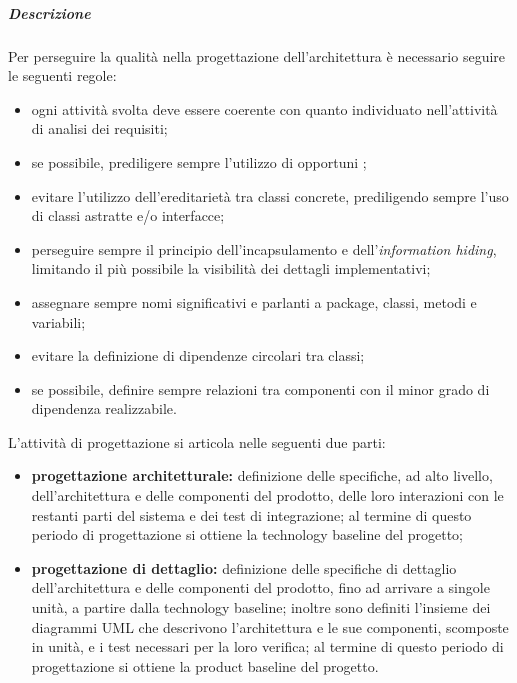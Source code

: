 				\subparagraph{Descrizione}
					Per perseguire la qualità nella progettazione dell'architettura è necessario seguire le seguenti regole:
					\begin{itemize}
						\item ogni attività svolta deve essere coerente con quanto individuato nell'attività di analisi dei requisiti;
						\item se possibile, prediligere sempre l'utilizzo di opportuni ;
						\item evitare l'utilizzo dell'ereditarietà tra classi concrete, prediligendo sempre l'uso di classi astratte e/o interfacce;
						\item perseguire sempre il principio dell'incapsulamento e dell'\textit{information hiding}, limitando il più possibile la visibilità dei dettagli implementativi;
						\item assegnare sempre nomi significativi e parlanti a package, classi, metodi e variabili;
						\item evitare la definizione di dipendenze circolari tra classi;
						\item se possibile, definire sempre relazioni tra componenti con il minor grado di dipendenza realizzabile.
					\end{itemize}
					L'attività di progettazione si articola nelle seguenti due parti:
					\begin{itemize}
						\item \textbf{progettazione architetturale:} definizione delle specifiche, ad alto livello, dell'architettura e delle componenti del prodotto, delle loro interazioni con le restanti parti del sistema e dei test di integrazione; al termine di questo periodo di progettazione si ottiene la technology baseline del progetto;
						\item \textbf{progettazione di dettaglio:} definizione delle specifiche di dettaglio dell'architettura e delle componenti del prodotto, fino ad arrivare a singole unità, a partire dalla technology baseline; inoltre sono definiti l'insieme dei diagrammi UML che descrivono l'architettura e le sue componenti, scomposte in unità, e i test necessari per la loro verifica; al termine di questo periodo di progettazione si ottiene la product baseline del progetto.
					\end{itemize}

